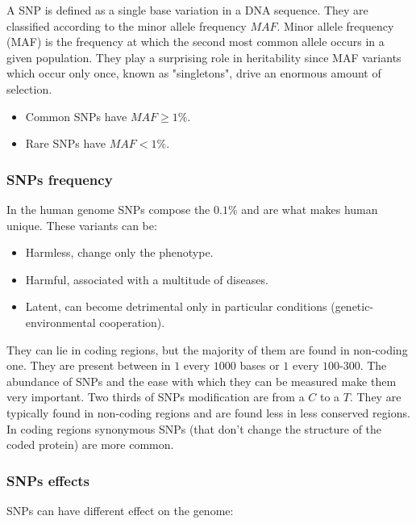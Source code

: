 	A SNP is defined as a single base variation in a DNA sequence.
	They are classified according to the minor allele frequency $MAF$.
	Minor allele frequency (MAF) is the frequency at which the second most common allele occurs in a given population.
	They play a surprising role in heritability since MAF variants which occur only once, known as "singletons", drive an enormous amount of selection.

	\begin{multicols}{2}
		\begin{itemize}
			\item Common SNPs have $MAF \ge 1\%$.
			\item Rare SNPs have $MAF < 1\%$.
		\end{itemize}
	\end{multicols}

		\subsubsection{SNPs frequency}
		In the human genome SNPs compose the $0.1\%$ and are what makes human unique.
		These variants can be:

		\begin{multicols}{3}
			\begin{itemize}
				\item Harmless, change only the phenotype.
				\item Harmful, associated with a multitude of diseases.
				\item Latent, can become detrimental only in particular conditions (genetic-environmental cooperation).
			\end{itemize}
		\end{multicols}

		They can lie in coding regions, but the majority of them are found in non-coding one.
		They are present between in $1$ every $1000$ bases or $1$ every $100$-$300$.
		The abundance of SNPs and the ease with which they can be measured make them very important.
		Two thirds of SNPs modification are from a $C$ to a $T$.
		They are typically found in non-coding regions and are found less in less conserved regions.
		In coding regions synonymous SNPs (that don't change the structure of the coded protein) are more common.

		\subsubsection{SNPs effects}
		SNPs can have different effect on the genome:

